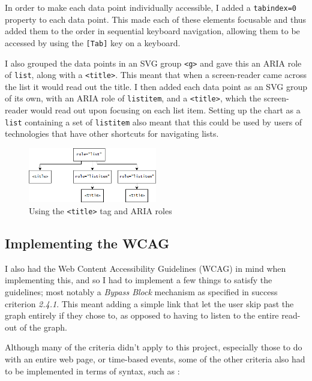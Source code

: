 \documentclass[ %
                    author={Aleena Baig},
                supervisor={Dr Simon Lock},
                    degree={BSc},
                     title={On Making Web Accessible Graphs},
                  subtitle={},
                      year={2019} ]{dissertation}
\begin{document}
In order to make each data point individually accessible, I added a \texttt{tabindex=0} property to each data point. This made each of these elements focusable and thus added them to the order in sequential keyboard navigation, allowing them to be accessed by using the \texttt{[Tab]} key on a keyboard.

I also grouped the data points in an SVG group \texttt{<g>} and gave this an ARIA role of \texttt{list}, along with a \texttt{<title>}. This meant that when a screen-reader came across the list it would read out the title. I then added each data point as an SVG group of its own, with an ARIA role of \texttt{listitem}, and a \texttt{<title>}, which the screen-reader would read out upon focusing on each list item. Setting up the chart as a \texttt{list} containing a set of \texttt{listitem} also meant that this could be used by users of technologies that have other shortcuts for navigating lists.

\begin{figure}[h]
\centering
\includegraphics[width=0.5\textwidth]{images/listitemnesting.png}
\caption{Using the \texttt{<title>} tag and ARIA roles}
\end{figure}

\subsection{Implementing the WCAG}

I also had the Web Content Accessibility Guidelines (WCAG) in mind when implementing this, and so I had to implement a few things to satisfy the guidelines; most notably a \textit{Bypass Block} mechanism as specified in success criterion \textit{2.4.1}. This meant adding a simple link that let the user skip past the graph entirely if they chose to, as opposed to having to listen to the entire read-out of the graph.

Although many of the criteria didn't apply to this project, especially those to do with an entire web page, or time-based events, some of the other criteria also had to be implemented in terms of syntax, such as :
\end{document}
